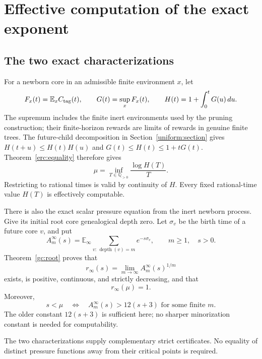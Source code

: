 \section{Effective computation of the exact exponent}
\label{ecc:section}

\subsection{The two exact characterizations}

For a newborn core in an admissible finite environment $x$, let
\[
 F_x(t)=\mathbb E_x C_{\rm tag}(t),\qquad
 G(t)=\sup_x F_x(t),\qquad H(t)=1+\int_0^tG(u)\,du.
\]
The supremum includes the finite inert environments used by the pruning
construction; their finite-horizon rewards are limits of rewards in
genuine finite trees.  The future-child decomposition in Section~\ref{uniform:section} gives
$H(t+u)\le H(t)H(u)$ and $G(t)\le H(t)\le1+tG(t)$.
Theorem~\ref{erc:equality} therefore gives
\begin{equation}\label{ecc:inf-characterization}
 \boxed{\displaystyle
 \mu=\inf_{T\in\mathbb Q_{>0}}\frac{\log H(T)}{T}.}
\end{equation}
Restricting to rational times is valid by continuity of $H$.
Every fixed rational-time value $H(T)$ is effectively computable.

There is also the exact scalar pressure equation from the inert newborn
process.  Give its initial root core genealogical depth zero.  Let
$\sigma_v$ be the birth time of a future core $v$, and put
\[
 A_m^\infty(s)=\mathbb E_\infty
       \sum_{v:\,\operatorname{depth}(v)=m}e^{-s\sigma_v},
 \qquad m\ge1,\quad s>0.
\]
Theorem~\ref{gc:root} proves that
\begin{equation}\label{ecc:pressure}
 r_\infty(s)=\lim_{m\to\infty}A_m^\infty(s)^{1/m}
\end{equation}
exists, is positive, continuous, and strictly decreasing, and that
\begin{equation}\label{ecc:unique-root}
 \boxed{r_\infty(\mu)=1.}
\end{equation}
Moreover,
\begin{equation}\label{ecc:lower-witness}
 s<\mu\quad\Longleftrightarrow\quad
 A_m^\infty(s)>12(s+3)\text{ for some finite }m.
\end{equation}
The older constant $12(s+3)$ is sufficient here; no sharper minorization
constant is needed for computability.

The two characterizations supply complementary strict certificates. No equality of distinct pressure functions away from their critical points is required.

